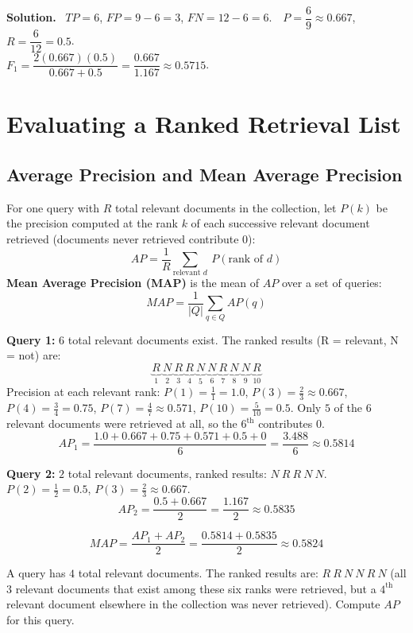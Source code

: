 \documentclass[11pt, a4paper]{article}
\newcommand{\Solution}{\medskip\noindent\textbf{\color{exgreen}Solution.}\ }
\begin{document}
\Solution
$TP=6$, $FP=9-6=3$, $FN=12-6=6$.\ \ $P=\dfrac{6}{9}\approx0.667$, \ $R=\dfrac{6}{12}=0.5$.\\
$F_1 = \dfrac{2(0.667)(0.5)}{0.667+0.5}=\dfrac{0.667}{1.167}\approx0.5715$.

\section{Evaluating a Ranked Retrieval List}

\subsection{Average Precision and Mean Average Precision}

\begin{formulabox}
For one query with $R$ total relevant documents in the collection, let $P(k)$ be the precision computed at the rank $k$ of each successive relevant document retrieved (documents never retrieved contribute $0$):
\[
AP = \frac{1}{R}\sum_{\text{relevant } d}\ P(\text{rank of } d)
\]
\textbf{Mean Average Precision (MAP)} is the mean of $AP$ over a set of queries:
\[
MAP = \frac{1}{|Q|}\sum_{q\in Q} AP(q)
\]
\end{formulabox}

\begin{examplebox}
\textbf{Query 1:} $6$ total relevant documents exist. The ranked results (R = relevant, N = not) are:
\[
\underbrace{R}_{1}\ \underbrace{N}_{2}\ \underbrace{R}_{3}\ \underbrace{R}_{4}\ \underbrace{N}_{5}\ \underbrace{N}_{6}\ \underbrace{R}_{7}\ \underbrace{N}_{8}\ \underbrace{N}_{9}\ \underbrace{R}_{10}
\]
Precision at each relevant rank: $P(1)=\tfrac11=1.0$, $P(3)=\tfrac23\approx0.667$, $P(4)=\tfrac34=0.75$, $P(7)=\tfrac47\approx0.571$, $P(10)=\tfrac5{10}=0.5$. Only $5$ of the $6$ relevant documents were retrieved at all, so the $6^{\text{th}}$ contributes $0$.
\[
AP_1 = \frac{1.0+0.667+0.75+0.571+0.5+0}{6} = \frac{3.488}{6} \approx 0.5814
\]

\textbf{Query 2:} $2$ total relevant documents, ranked results: $N\ R\ R\ N\ N$.
$P(2)=\tfrac12=0.5$, $P(3)=\tfrac23\approx0.667$.
\[
AP_2 = \frac{0.5+0.667}{2} = \frac{1.167}{2} \approx 0.5835
\]

\[
MAP = \frac{AP_1+AP_2}{2} = \frac{0.5814+0.5835}{2}\approx 0.5824
\]
\end{examplebox}

\begin{exercisebox}
A query has $4$ total relevant documents. The ranked results are: $R\ R\ N\ N\ R\ N$ (all $3$ relevant documents that exist among these six ranks were retrieved, but a $4^{\text{th}}$ relevant document elsewhere in the collection was never retrieved). Compute $AP$ for this query.
\end{exercisebox}
\end{document}
